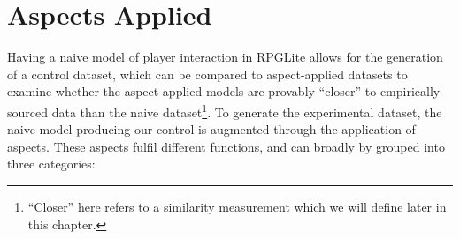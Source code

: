 

\section{Aspects Applied}\label{sec:optimisation_with_aspects_aspectsdeveloped}








Having a naive model of player interaction in RPGLite allows for the generation
of a control dataset, which can be compared to aspect-applied datasets to
examine whether the aspect-applied models are provably ``closer'' to
empirically-sourced data than the naive dataset\footnote{``Closer'' here refers
to a similarity measurement which we will define later in this chapter.}. To
generate the experimental dataset, the naive model producing our control is
augmented through the application of aspects. These aspects fulfil different
functions, and can broadly by grouped into three categories:


